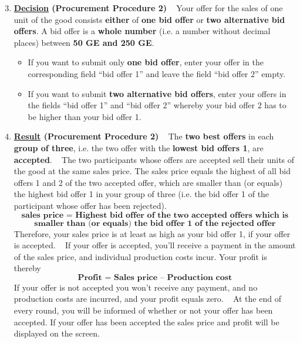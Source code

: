 \documentclass[11pt]{scrartcl}
\begin{document}
\begin{enumerate}[label=\textbf{\upshape(\arabic*\upshape)}] \setcounter{enumi}{2}
	\item \textbf{\underline{Decision} (Procurement Procedure 2)} ~\smallbreak
		Your offer for the sales of one unit of the good consists \textbf{either} of \textbf{one bid offer} or \textbf{two alternative bid offers}. A bid offer is a \textbf{whole number} (i.e. a number without decimal places) between \textbf{50 GE and 250 GE}. 
		\begin{itemize}
			\item If you want to submit only \textbf{one bid offer}, enter your offer in the corresponding field \enquote{bid offer 1} and leave the field \enquote{bid offer 2} empty.
			\item If you want to submit \textbf{two alternative bid offers}, enter your offers in the fields \enquote{bid offer 1} and \enquote{bid offer 2} whereby your bid offer 2 has to be higher than your bid offer 1.
		\end{itemize}
	\item \textbf{\underline{Result} (Procurement Procedure 2)} ~\smallbreak
		The \textbf{two best offers} in each \textbf{group of three}, i.e. the two offer with the \textbf{lowest bid offers 1}, are \textbf{accepted}. ~\medbreak
		The two participants whose offers are accepted sell their units of the good at the same sales price. The sales price equals the highest of all bid offers 1 and 2 of the two accepted offer, which are smaller than (or equals) the highest bid offer 1 in your group of three (i.e. the bid offer 1 of the participant whose offer has been rejected).
		$$ \textbf{sales price = Highest bid offer of the two accepted offers which is} $$
				$$\textbf{smaller than (or equals) the bid offer 1 of the rejected offer} $$
		Therefore, your sales price is at least as high as your bid offer 1, if your offer is accepted. ~\medbreak
		If your offer is accepted, you’ll receive a payment in the amount of the sales price, and individual production costs incur. Your profit is thereby
		$$ \textbf{Profit = Sales price – Production cost} $$
		If your offer is not accepted you won’t receive any payment, and no production costs are incurred, and your profit equals zero. ~\smallbreak
		At the end of every round, you will be informed of whether or not your offer has been accepted. If your offer has been accepted the sales price and profit will be displayed on the screen.
\end{enumerate}
\end{document}
